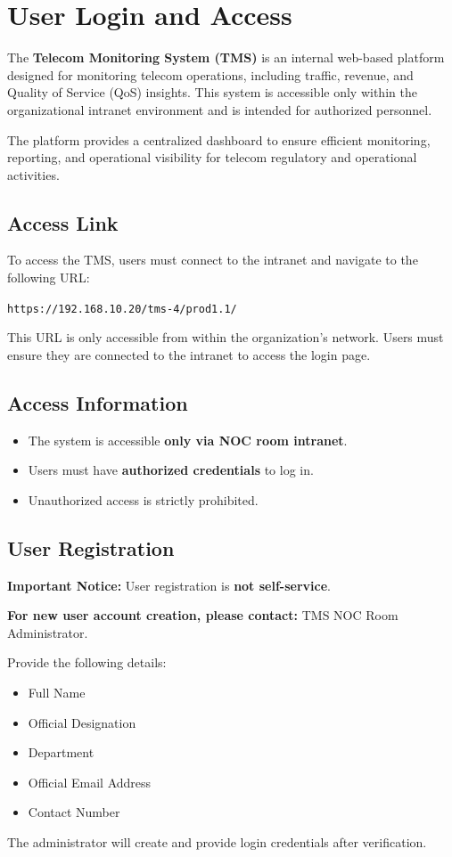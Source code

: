\section{User Login and Access}
The \textbf{Telecom Monitoring System (TMS)} is an internal web-based platform designed for monitoring telecom operations, including traffic, revenue, and Quality of Service (QoS) insights. This system is accessible only within the organizational intranet environment and is intended for authorized personnel.

The platform provides a centralized dashboard to ensure efficient monitoring, reporting, and operational visibility for telecom regulatory and operational activities.

\subsection{Access Link}
To access the TMS, users must connect to the intranet and navigate to the following URL:
\begin{center}
  \texttt{https://192.168.10.20/tms-4/prod1.1/}
\end{center}
This URL is only accessible from within the organization's network. Users must ensure they are connected to the intranet to access the login page.
\subsection{Access Information}
\begin{itemize}[label=--]
  \item The system is accessible \textbf{only via NOC room intranet}.
  \item Users must have \textbf{authorized credentials} to log in.
  \item Unauthorized access is strictly prohibited.
\end{itemize}

\subsection{User Registration}
\begin{tcolorbox}[colback=yellow!10]
  \textbf{Important Notice:} User registration is \textbf{not self-service}.

  \textbf{For new user account creation, please contact:}
  {TMS NOC Room Administrator.}
\end{tcolorbox}
Provide the following details:
\begin{itemize}
  \item[\boxed{$\checkmark$}] Full Name
  \item[\boxed{$\checkmark$}] Official Designation
  \item[\boxed{$\checkmark$}] Department
  \item[\boxed{$\checkmark$}] Official Email Address
  \item[\boxed{$\checkmark$}] Contact Number
\end{itemize}
The administrator will create and provide login credentials after verification.
\newpage

